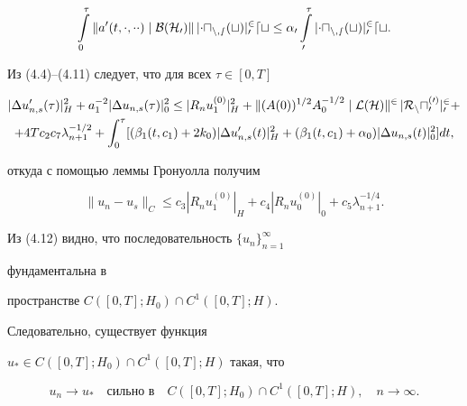 \begin{pf}
\begin{equation}
\int\limits^\tau_0\|a'(t,\cdot,\cdot{}\cdot)\mid\cal B(H_0)\|\, 


|\Delta u_{n,s}(t)|^2_0dt \le  


\alpha_0\int\limits^\tau_0|\Delta u_{n,s}(t)|^2_0dt. 


\end{equation} 


Из (4.4)--(4.11) следует, что для всех $\tau\in[0,T]$ 


\begin{multline*} 


|\Delta u'_{n,s}(\tau)|^2_H+a^{-2}_1|\Delta u_{n,s}(\tau)|^2_0\le 


|R_n u^{(0)}_1|^2_H+\|(A(0))^{1/2}A^{-1/2}_0\mid\cal L(H)\|^2\, 


|R_n u^{(0)}_0|^2_0 + \\ 


% 


+ 4T c_2c_7\lambda^{-1/2}_{n+1}+\int^\tau_0 


[(\beta_1(t,c_1)+2k_0)|\Delta u'_{n,s}(t)|^2_H+ 


(\beta_1(t,c_1)+\alpha_0)|\Delta u_{n,s}(t)|^2_0]dt, 


\end{multline*} 


откуда с помощью леммы Гронуолла получим 


\begin{equation} 


\|u_n-u_s\|_C\le c_3|R_n u^{(0)}_1|_H+c_4|R_n u^{(0)}_0|_0+


c_5\lambda^{-1/4}_{n+1}. 


\end{equation} 


Из (4.12) видно, что последовательность $\{u_n\}^\infty_{n=1}$ 


фундаментальна в 


пространстве $C([0,T];H_0)\cap C^1([0,T];H)$. 


Следовательно, существует функция 


$u_*\in C([0,T];H_0)\cap C^1([0,T];H)$ такая, что 


\begin{equation} 


u_n\to u_*\quad 


\text{сильно в}\quad 


C([0,T];H_0)\cap C^1([0,T];H),\quad n\to\infty. 


\end{equation} 



\end{pf}
